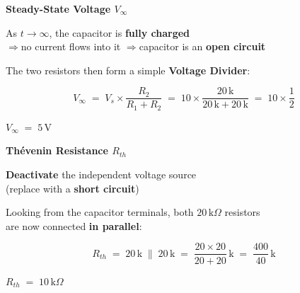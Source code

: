 \documentclass[12pt]{beamer}
\newcommand{\rarrow}{\textcolor{madblue}{$\boldsymbol{\Rightarrow}$}\;}
\begin{document}
\begin{frame}{\textbf{Steady-State Voltage $V_\infty$}}
  \begin{center}
    \vfill
    As $t \to \infty$, the capacitor is \textbf{fully charged}\\[0.4em]
    \rarrow no current flows into it \rarrow capacitor is an \textbf{open circuit}

    \vspace{1.2em}
    The two resistors then form a simple \textbf{Voltage Divider}:

    \vspace{0.8em}
    \[
      V_\infty \;=\; V_s \times \frac{R_2}{R_1 + R_2}
              \;=\; 10 \times \frac{20\,\mathrm{k}}{20\,\mathrm{k} + 20\,\mathrm{k}}
              \;=\; 10 \times \frac{1}{2}
    \]

    \vspace{1em}
    \Large\textbf{\textcolor{madblue}{$V_\infty \;=\; 5\,\mathrm{V}$}}
    \vfill
  \end{center}
\end{frame}

\begin{frame}{\textbf{Thévenin Resistance $R_{th}$}}
  \begin{center}
    \vfill
    \textbf{Deactivate} the independent voltage source\\[0.3em]
    (replace with a \textbf{short circuit})

    \vspace{1em}
    Looking from the capacitor terminals, both $20\,\mathrm{k}\Omega$ resistors\\[0.3em]
    are now connected \textbf{in parallel}:

    \vspace{0.8em}
    \[
      R_{th} \;=\; 20\,\mathrm{k} \;\|\; 20\,\mathrm{k}
             \;=\; \frac{20 \times 20}{20 + 20}\,\mathrm{k}
             \;=\; \frac{400}{40}\,\mathrm{k}
    \]

    \vspace{1em}
    \Large\textbf{\textcolor{madblue}{$R_{th} \;=\; 10\,\mathrm{k}\Omega$}}
    \vfill
  \end{center}
\end{frame}
\end{document}
